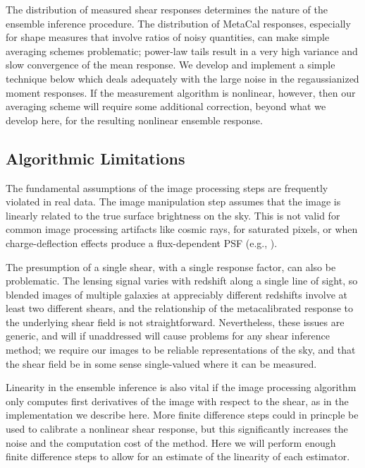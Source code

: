 \documentclass[iop]{emulateapj}
\begin{document}
The distribution of measured shear responses determines the nature of
the ensemble inference procedure. The distribution of MetaCal
responses, especially for shape measures that involve ratios of noisy
quantities, can make simple averaging schemes problematic; power-law
tails result in a very high variance and slow convergence of the mean
response. We develop and implement a simple technique below which
deals adequately with the large noise in the regaussianized moment
responses. If the measurement algorithm is nonlinear, however, then
our averaging scheme will require some additional correction, beyond
what we develop here, for the resulting nonlinear ensemble response.


\subsection{Algorithmic Limitations}
The fundamental assumptions of the image processing steps are
frequently violated in real data. The image manipulation step assumes
that the image is linearly related to the true surface brightness on
the sky. This is not valid for common image processing artifacts like
cosmic rays, for saturated pixels, or when charge-deflection effects
produce a flux-dependent PSF (e.g.,
\citealt{2015JInst..10C5032G, 2017JInst..12C3091L}). 

The presumption of a single shear, with a single response factor, can
also be problematic. The lensing signal varies with redshift along a
single line of sight, so blended images of multiple galaxies at
appreciably different redshifts involve at least two different shears,
and the relationship of the metacalibrated response to the underlying
shear field is not straightforward. Nevertheless, these issues are
generic, and will if unaddressed will cause problems for any shear
inference method; we require our images to be reliable representations
of the sky, and that the shear field be in some sense single-valued
where it can be measured.

Linearity in the ensemble inference is also vital if the image
processing algorithm only computes first derivatives of the image with
respect to the shear, as in the implementation we describe here. More
finite difference steps could in princple be used to calibrate a
nonlinear shear response, but this significantly increases the noise
and the computation cost of the method. Here we will perform enough
finite difference steps to allow for an estimate of the linearity of
each estimator.
\end{document}
